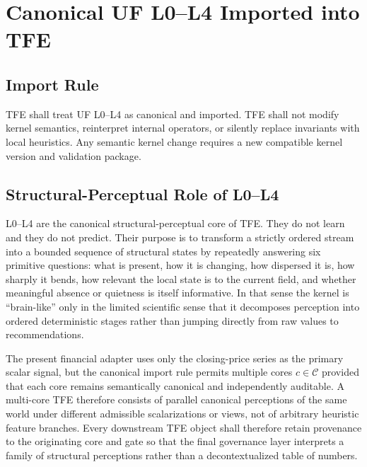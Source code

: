 \chapter{Canonical UF L0--L4 Imported into TFE}
\section{Import Rule}

TFE shall treat UF L0--L4 as canonical and imported. TFE shall not modify kernel semantics, reinterpret internal operators, or silently replace invariants with local heuristics. Any semantic kernel change requires a new compatible kernel version and validation package.


\section{Structural-Perceptual Role of L0--L4}

L0--L4 are the canonical structural-perceptual core of TFE. They do not learn and they do not predict. Their purpose is to transform a strictly ordered stream into a bounded sequence of structural states by repeatedly answering six primitive questions: what is present, how it is changing, how dispersed it is, how sharply it bends, how relevant the local state is to the current field, and whether meaningful absence or quietness is itself informative. In that sense the kernel is ``brain-like'' only in the limited scientific sense that it decomposes perception into ordered deterministic stages rather than jumping directly from raw values to recommendations.

The present financial adapter uses only the closing-price series as the primary scalar signal, but the canonical import rule permits multiple cores $c\in\mathcal{C}$ provided that each core remains semantically canonical and independently auditable. A multi-core TFE therefore consists of parallel canonical perceptions of the same world under different admissible scalarizations or views, not of arbitrary heuristic feature branches. Every downstream TFE object shall therefore retain provenance to the originating core and gate so that the final governance layer interprets a family of structural perceptions rather than a decontextualized table of numbers.


